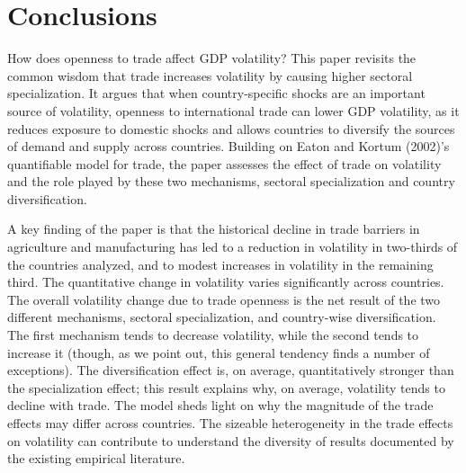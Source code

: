 \documentclass[12pt]{article}
\begin{document}
\section{Conclusions}

How does openness to trade affect GDP volatility? This paper revisits the
common wisdom that trade increases volatility by causing higher sectoral
specialization. It argues that when country-specific shocks are an important
source of volatility, openness to international trade can lower GDP
volatility, as it reduces exposure to domestic shocks and allows countries
to diversify the sources of demand and supply across countries. Building on
Eaton and Kortum (2002)'s quantifiable model for trade, the paper assesses
the effect of trade on volatility and the role played by these two
mechanisms, sectoral specialization and country diversification.

A key finding of the paper is that the historical decline in trade barriers
in agriculture and manufacturing has led to a reduction in volatility in
two-thirds of the countries analyzed, and to modest increases in volatility
in the remaining third. The quantitative change in volatility varies
significantly across countries. The overall volatility change due to trade
openness is the net result of the two different mechanisms, sectoral
specialization, and country-wise diversification. The first mechanism tends
to decrease volatility, while the second tends to increase it (though, as we
point out, this general tendency finds a number of exceptions). The
diversification effect is, on average, quantitatively stronger than the
specialization effect; this result explains why, on average, volatility
tends to decline with trade. The model sheds light on why the magnitude of
the trade effects may differ across countries. The sizeable heterogeneity in
the trade effects on volatility can contribute to understand the diversity
of results documented by the existing empirical literature.\pagebreak
\end{document}

